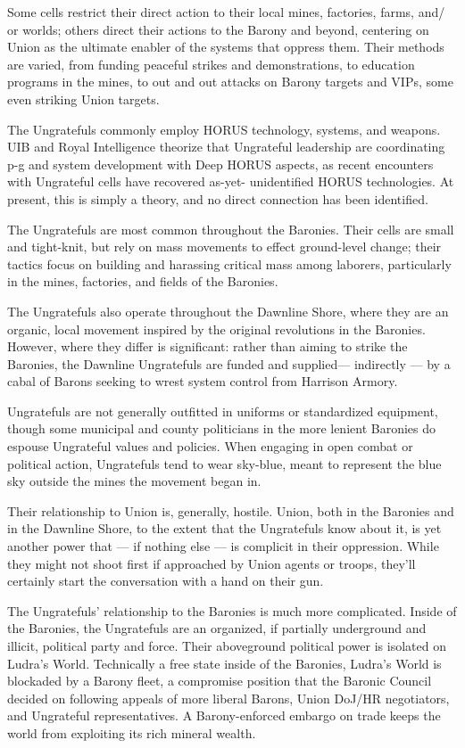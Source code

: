 Some cells restrict their direct action to their local mines, factories, farms, and/ or worlds; others
direct their actions to the Barony and beyond, centering on Union as the ultimate enabler of the
systems that oppress them. Their methods are varied, from funding peaceful strikes and
demonstrations, to education programs in the mines, to out and out attacks on Barony targets
and VIPs, some even striking Union targets.

The Ungratefuls commonly employ HORUS technology, systems, and weapons. UIB and Royal
Intelligence theorize that Ungrateful leadership are coordinating p-g and system development
with Deep HORUS aspects, as recent encounters with Ungrateful cells have recovered as-yet-
unidentified HORUS technologies. At present, this is simply a theory, and no direct connection
has been identified.

The Ungratefuls are most common throughout the Baronies. Their cells are small and tight-knit,
but rely on mass movements to effect ground-level change; their tactics focus on building and
harassing critical mass among laborers, particularly in the mines, factories, and fields of the
Baronies.

The Ungratefuls also operate throughout the Dawnline Shore, where they are an organic, local
movement inspired by the original revolutions in the Baronies. However, where they differ is
significant: rather than aiming to strike the Baronies, the Dawnline Ungratefuls are funded and
supplied— indirectly — by a cabal of Barons seeking to wrest system control from Harrison
Armory.

Ungratefuls are not generally outfitted in uniforms or standardized equipment, though some
municipal and county politicians in the more lenient Baronies do espouse Ungrateful values and
policies. When engaging in open combat or political action, Ungratefuls tend to wear sky-blue,
meant to represent the blue sky outside the mines the movement began in.

Their relationship to Union is, generally, hostile. Union, both in the Baronies and in the Dawnline
Shore, to the extent that the Ungratefuls know about it, is yet another power that — if nothing
else — is complicit in their oppression. While they might not shoot first if approached by Union
agents or troops, they’ll certainly start the conversation with a hand on their gun.

The Ungratefuls’ relationship to the Baronies is much more complicated. Inside of the Baronies,
the Ungratefuls are an organized, if partially underground and illicit, political party and force.
Their aboveground political power is isolated on Ludra’s World. Technically a free state inside of
the Baronies, Ludra’s World is blockaded by a Barony fleet, a compromise position that the
Baronic Council decided on following appeals of more liberal Barons, Union DoJ/HR negotiators,
and Ungrateful representatives. A Barony-enforced embargo on trade keeps the world from
exploiting its rich mineral wealth.

